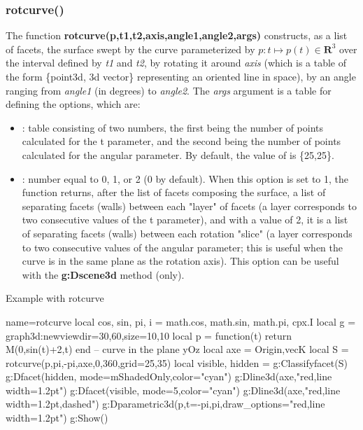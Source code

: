 \subsubsection{rotcurve()}
The function \textbf{rotcurve(p,t1,t2,axis,angle1,angle2,args)} constructs, as a list of facets, the surface swept by the curve parameterized by $p\colon t\mapsto p(t)\in \mathbf R^3$ over the interval defined by \emph{t1} and \emph{t2}, by rotating it around \emph{axis} (which is a table of the form \{point3d, 3d vector\} representing an oriented line in space), by an angle ranging from \emph{angle1} (in degrees) to \emph{angle2}. The \emph{args} argument is a table for defining the options, which are:
\begin{itemize}
    \item {}: table consisting of two numbers, the first being the number of points calculated for the t parameter, and the second being the number of points calculated for the angular parameter. By default, the value of  is \{25,25\}.

    \item {}: number equal to 0, 1, or 2 (0 by default). When this option is set to 1, the function returns, after the list of facets composing the surface, a list of separating facets (walls) between each "layer" of facets (a layer corresponds to two consecutive values ​​of the t parameter), and with a value of 2, it is a list of separating facets (walls) between each rotation "slice" (a layer corresponds to two consecutive values ​​of the angular parameter; this is useful when the curve is in the same plane as the rotation axis). This option can be useful with the \textbf{g:Dscene3d} method (only).
\end{itemize}

\begin{demo}{Example with rotcurve}
\begin{luadraw}{name=rotcurve}
local cos, sin, pi, i = math.cos, math.sin, math.pi, cpx.I
local g = graph3d:new{viewdir={30,60},size={10,10}}
local p = function(t) return M(0,sin(t)+2,t) end -- curve in the plane yOz
local axe = {Origin,vecK}
local S = rotcurve(p,pi,-pi,axe,0,360,{grid={25,35}})
local  visible, hidden = g:Classifyfacet(S)
g:Dfacet(hidden, {mode=mShadedOnly,color="cyan"})
g:Dline3d(axe,"red,line width=1.2pt")
g:Dfacet(visible, {mode=5,color="cyan"})
g:Dline3d(axe,"red,line width=1.2pt,dashed")
g:Dparametric3d(p,{t={-pi,pi},draw_options="red,line width=1.2pt"})
g:Show()
\end{luadraw}
\end{demo}


